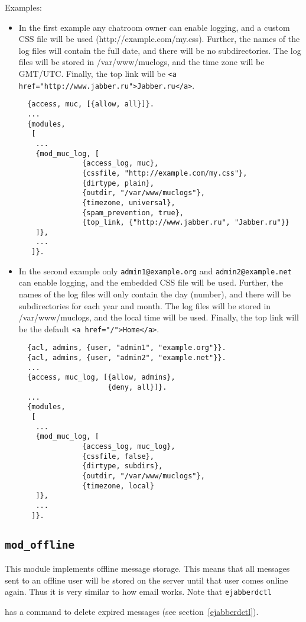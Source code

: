 \documentclass[a4paper,10pt]{article}
\newcommand{\ind}[1]{\begin{latexonly}\index{#1}\end{latexonly}}
\newcommand{\jid}[1]{\texttt{#1}}
\newcommand{\term}[1]{\texttt{#1}}
\newcommand{\module}[1]{\texttt{#1}}
\newcommand{\modoffline}{\module{mod\_offline}}
\begin{document}
Examples:
\begin{itemize}
\item In the first example any chatroom owner can enable logging, and a
  custom CSS file will be used (http://example.com/my.css). Further, the names
  of the log files will contain the full date, and there will be no
  subdirectories. The log files will be stored in /var/www/muclogs, and the
  time zone will be GMT/UTC. Finally, the top link will be
  \verb|<a href="http://www.jabber.ru">Jabber.ru</a>|.
  \begin{verbatim}
  {access, muc, [{allow, all}]}.
  ...
  {modules,
   [
    ...
    {mod_muc_log, [
               {access_log, muc},
               {cssfile, "http://example.com/my.css"},
               {dirtype, plain},
               {outdir, "/var/www/muclogs"},
               {timezone, universal},
               {spam_prevention, true},
               {top_link, {"http://www.jabber.ru", "Jabber.ru"}}
    ]},
    ...
   ]}.
\end{verbatim}
  \item In the second example only \jid{admin1@example.org} and
  \jid{admin2@example.net} can enable logging, and the embedded CSS file will be
  used. Further, the names of the log files will only contain the day (number),
  and there will be subdirectories for each year and month. The log files will
  be stored in /var/www/muclogs, and the local time will be used. Finally, the
  top link will be the default \verb|<a href="/">Home</a>|.
  \begin{verbatim}
  {acl, admins, {user, "admin1", "example.org"}}.
  {acl, admins, {user, "admin2", "example.net"}}.
  ...
  {access, muc_log, [{allow, admins},
                     {deny, all}]}.
  ...
  {modules,
   [
    ...
    {mod_muc_log, [
               {access_log, muc_log},
               {cssfile, false},
               {dirtype, subdirs},
               {outdir, "/var/www/muclogs"},
               {timezone, local}
    ]},
    ...
   ]}.
\end{verbatim}
\end{itemize}

\subsection{\modoffline{}}
\label{modoffline}
\ind{modules!\modoffline{}}

This module implements offline message storage. This means that all messages
sent to an offline user will be stored on the server until that user comes
online again. Thus it is very similar to how email works. Note that
\term{ejabberdctl}\ind{ejabberdctl} has a command to delete expired messages
(see section~\ref{ejabberdctl}).
\end{document}
